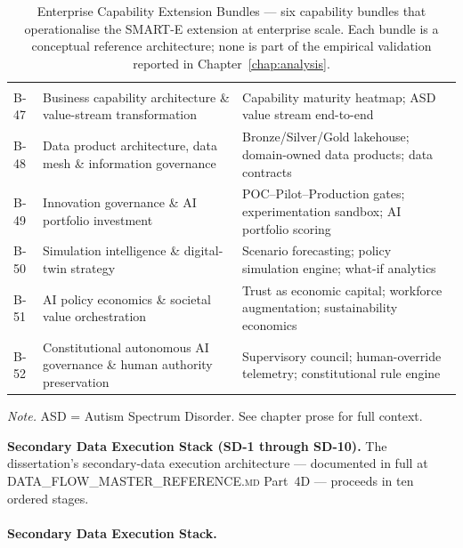 {\tablestripes\tablefontsize
\begin{xltabular}{\textwidth}{@{} >{\centering\arraybackslash}p{1.0cm} >{\raggedright\arraybackslash}p{4.5cm} L @{}}
\caption[Enterprise Capability Extension Bundles (Phases 47--52)]{Enterprise Capability Extension Bundles --- six capability bundles that operationalise the SMART-E extension at enterprise scale. Each bundle is a conceptual reference architecture; none is part of the empirical validation reported in Chapter~\ref{chap:analysis}.}\label{tab:enterprise_capability_extension} \\
\toprule
{} &  &  \\
\midrule
\endfirsthead
\toprule
{} &  &  \\
\midrule
\endhead
\bottomrule
\endlastfoot
B-47 & Business capability architecture \& value-stream transformation & Capability maturity heatmap; ASD value stream end-to-end \\
B-48 & Data product architecture, data mesh \& information governance & Bronze/Silver/Gold lakehouse; domain-owned data products; data contracts \\
B-49 & Innovation governance \& AI portfolio investment & POC--Pilot--Production gates; experimentation sandbox; AI portfolio scoring \\
B-50 & Simulation intelligence \& digital-twin strategy & Scenario forecasting; policy simulation engine; what-if analytics \\
B-51 & AI policy economics \& societal value orchestration & Trust as economic capital; workforce augmentation; sustainability economics \\
B-52 & Constitutional autonomous AI governance \& human authority preservation & Supervisory council; human-override telemetry; constitutional rule engine \\
\end{xltabular}}
\vspace{0.3em}\noindent\textit{Note.} ASD = Autism Spectrum Disorder. See chapter prose for full context.

\noindent\textbf{Secondary Data Execution Stack (SD-1 through SD-10).} The dissertation's secondary-data execution architecture --- documented in full at \textsc{DATA\_FLOW\_MASTER\_REFERENCE.md} Part~4D --- proceeds in ten ordered stages.

\paragraph{Secondary Data Execution Stack.}


